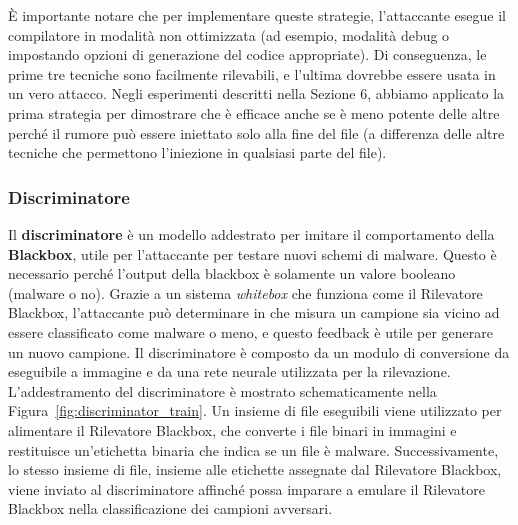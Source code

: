 È importante notare che per implementare queste strategie, l'attaccante esegue il compilatore in modalità non ottimizzata (ad esempio, modalità debug o impostando opzioni di generazione del codice appropriate). Di conseguenza, le prime tre tecniche sono facilmente rilevabili, e l'ultima dovrebbe essere usata in un vero attacco. Negli esperimenti descritti nella Sezione 6, abbiamo applicato la prima strategia per dimostrare che è efficace anche se è meno potente delle altre perché il rumore può essere iniettato solo alla fine del file (a differenza delle altre tecniche che permettono l'iniezione in qualsiasi parte del file).

\subsubsection{Discriminatore}
Il \textbf{discriminatore} è un modello addestrato per imitare il comportamento della \textbf{\gls{Blackbox}}, utile per l'attaccante per testare nuovi schemi di malware. Questo è necessario perché l'output della blackbox è solamente un valore booleano (malware o no). Grazie a un sistema \textit{whitebox} che funziona come il Rilevatore Blackbox, l'attaccante può determinare in che misura un campione sia vicino ad essere classificato come malware o meno, e questo feedback è utile per generare un nuovo campione.
Il discriminatore è composto da un modulo di conversione da eseguibile a immagine e da una rete neurale utilizzata per la rilevazione. L'addestramento del discriminatore è mostrato schematicamente nella Figura~\ref{fig:discriminator_train}. Un insieme di file eseguibili viene utilizzato per alimentare il Rilevatore Blackbox, che converte i file binari in immagini e restituisce un'etichetta binaria che indica se un file è malware. Successivamente, lo stesso insieme di file, insieme alle etichette assegnate dal Rilevatore Blackbox, viene inviato al discriminatore affinché possa imparare a emulare il Rilevatore Blackbox nella classificazione dei campioni avversari.


